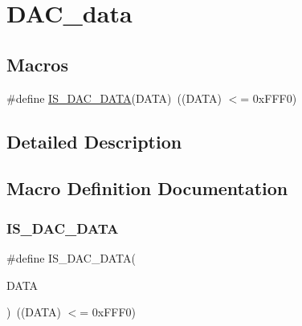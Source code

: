 \hypertarget{group___d_a_c__data}{}\section{D\+A\+C\+\_\+data}
\label{group___d_a_c__data}
\subsection*{Macros}
\begin{DoxyCompactItemize}
\item 
\#define \mbox{\hyperlink{group___d_a_c__data_ga903e28d4971e172b37c1c2fc17c2a884}{I\+S\+\_\+\+D\+A\+C\+\_\+\+D\+A\+TA}}(D\+A\+TA)~((D\+A\+TA) $<$= 0x\+F\+F\+F0)
\end{DoxyCompactItemize}


\subsection{Detailed Description}


\subsection{Macro Definition Documentation}
\mbox{\label{group___d_a_c__data_ga903e28d4971e172b37c1c2fc17c2a884}} 
\subsubsection{\texorpdfstring{IS\_DAC\_DATA}{IS\_DAC\_DATA}}
{\footnotesize\ttfamily \#define I\+S\+\_\+\+D\+A\+C\+\_\+\+D\+A\+TA(\begin{DoxyParamCaption}\item[{}]{D\+A\+TA }\end{DoxyParamCaption})~((D\+A\+TA) $<$= 0x\+F\+F\+F0)}

